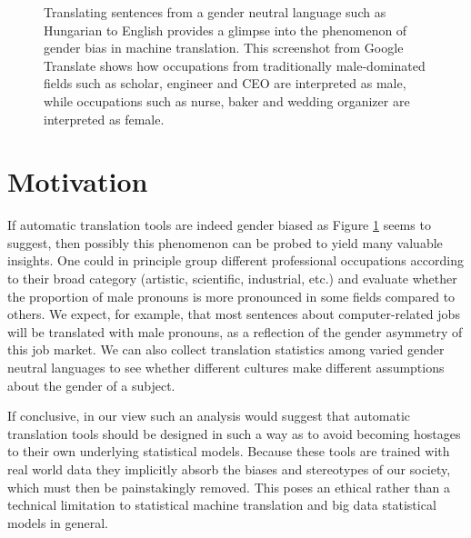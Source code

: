 \documentclass{article}
\begin{document}
\begin{figure}[h]
	\centering
	\label{fig:screenshot-gtranslate-hungarian}
	\caption{Translating sentences from a gender neutral language such as Hungarian to English provides a glimpse into the phenomenon of gender bias in machine translation. This screenshot from Google Translate shows how occupations from traditionally male-dominated fields such as scholar, engineer and CEO are interpreted as male, while occupations such as nurse, baker and wedding organizer are interpreted as female.}
\end{figure}

\section{Motivation}

If automatic translation tools are indeed gender biased as Figure \ref{fig:screenshot-gtranslate-hungarian} seems to suggest, then possibly this phenomenon can be probed to yield many valuable insights. One could in principle group different professional occupations according to their broad category (artistic, scientific, industrial, etc.) and evaluate whether the proportion of male pronouns is more pronounced in some fields compared to others. We expect, for example, that most sentences about computer-related jobs will be translated with male pronouns, as a reflection of the gender asymmetry of this job market. We can also collect translation statistics among varied gender neutral languages to see whether different cultures make different assumptions about the gender of a subject.

If conclusive, in our view such an analysis would suggest that automatic translation tools should be designed in such a way as to avoid becoming hostages to their own underlying statistical models. Because these tools are trained with real world data they implicitly absorb the biases and stereotypes of our society, which must then be painstakingly removed. This poses an ethical rather than a technical limitation to statistical machine translation and big data statistical models in general.
\end{document}
